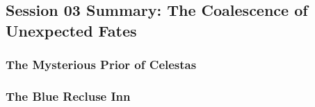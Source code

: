 \subsection{Session 03 Summary: The Coalescence of Unexpected Fates}

\subsubsection{The Mysterious Prior of Celestas}

\subsubsection{The Blue Recluse Inn}